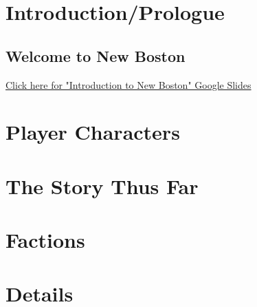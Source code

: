 \documentclass[./main.tex]{subfiles}
\begin{document}
\chapter{Introduction/Prologue}
\section{Welcome to New Boston}
\href{https://docs.google.com/presentation/u/1/d/13Hbt2Rm3DoAlUIxp9oq9LfUnqbkK6oH0r8l4-7jWVqs/edit?usp=sharing_eil&ts=5c2e8296}
{Click here for "Introduction to New Boston" Google Slides}
\chapter{Player Characters}


\chapter{The Story Thus Far}








\chapter{Factions}

\chapter{Details}

\end{document}
